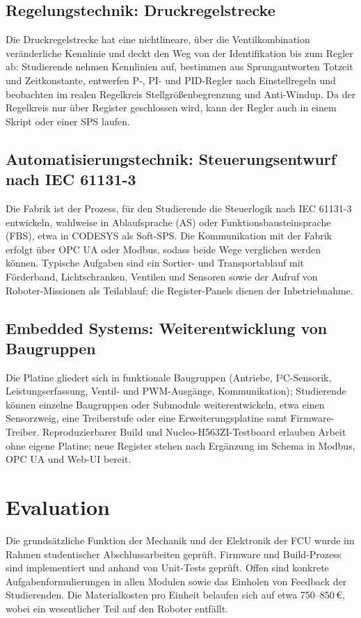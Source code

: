 \documentclass[]{article}%
\begin{document}
\subsection{Regelungstechnik: Druckregelstrecke}
Die Druckregelstrecke hat eine nichtlineare, über die Ventilkombination veränderliche Kennlinie und deckt den Weg von der Identifikation bis zum Regler ab: Studierende nehmen Kennlinien auf, bestimmen aus Sprungantworten Totzeit und Zeitkonstante, entwerfen P-, PI- und PID-Regler nach Einstellregeln und beobachten im realen Regelkreis Stellgrößenbegrenzung und Anti-Windup. Da der Regelkreis nur über Register geschlossen wird, kann der Regler auch in einem Skript oder einer SPS laufen.
\subsection{Automatisierungstechnik: Steuerungsentwurf nach IEC 61131-3}
Die Fabrik ist der Prozess, für den Studierende die Steuerlogik nach IEC 61131-3 \cite{iec61131} entwickeln, wahlweise in Ablaufsprache (AS) oder Funktionsbausteinsprache (FBS), etwa in CODESYS als Soft-SPS. Die Kommunikation mit der Fabrik erfolgt über OPC UA oder Modbus, sodass beide Wege verglichen werden können. Typische Aufgaben sind ein Sortier- und Transportablauf mit Förderband, Lichtschranken, Ventilen und Sensoren sowie der Aufruf von Roboter-Missionen als Teilablauf; die Register-Panels dienen der Inbetriebnahme.
\subsection{Embedded Systems: Weiterentwicklung von Baugruppen}
Die Platine gliedert sich in funktionale Baugruppen (Antriebe, I²C-Sensorik, Leistungserfassung, Ventil- und PWM-Ausgänge, Kommunikation); Studierende können einzelne Baugruppen oder Submodule weiterentwickeln, etwa einen Sensorzweig, eine Treiberstufe oder eine Erweiterungsplatine samt Firmware-Treiber. Reproduzierbarer Build und Nucleo-H563ZI-Testboard erlauben Arbeit ohne eigene Platine; neue Register stehen nach Ergänzung im Schema in Modbus, OPC UA und Web-UI bereit.


\section{Evaluation}
\label{sec:evaluation}
Die grundsätzliche Funktion der Mechanik und der Elektronik der FCU wurde im Rahmen studentischer Abschlussarbeiten geprüft. Firmware und Build-Prozess sind implementiert und anhand von Unit-Tests geprüft. Offen sind konkrete Aufgabenformulierungen in allen Modulen sowie das Einholen von Feedback der Studierenden. Die Materialkosten pro Einheit belaufen sich auf etwa 750--850\,€, wobei ein wesentlicher Teil auf den Roboter entfällt.
\end{document}

